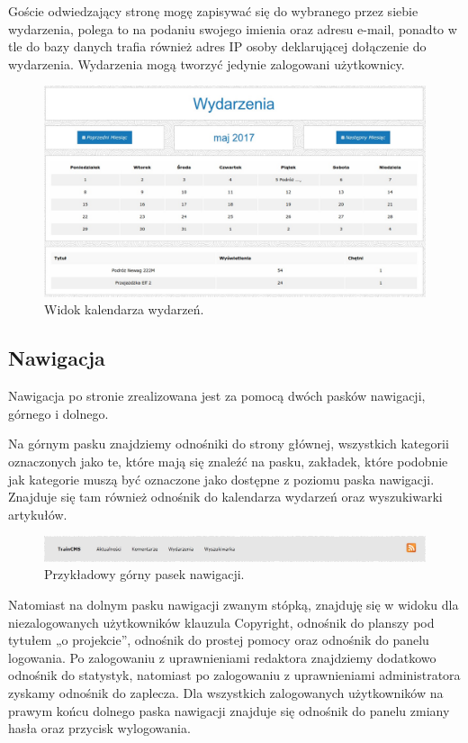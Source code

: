 \documentclass[openright]{xmgr}
\begin{document}
Goście odwiedzający stronę mogę zapisywać się do wybranego przez siebie wydarzenia, polega to na podaniu swojego imienia oraz adresu e-mail, ponadto w tle do bazy danych trafia również adres IP osoby deklarującej dołączenie do wydarzenia. Wydarzenia mogą tworzyć jedynie zalogowani użytkownicy.

\begin{figure}[!tbh]
\centering
\includegraphics[width=\linewidth]{fig/events}
\caption{Widok kalendarza wydarzeń.}
\end{figure}

\subsection{Nawigacja}
Nawigacja po stronie zrealizowana jest za pomocą dwóch pasków nawigacji, górnego i dolnego.

Na górnym pasku znajdziemy odnośniki do strony głównej, wszystkich kategorii oznaczonych jako te, które mają się znaleźć na pasku, zakładek, które podobnie jak kategorie muszą być oznaczone jako dostępne z poziomu paska nawigacji. Znajduje się tam również odnośnik do kalendarza wydarzeń oraz wyszukiwarki artykułów.

\begin{figure}[!tbh]
\centering
\includegraphics[width=\linewidth]{fig/navbar}
\caption{Przykładowy górny pasek nawigacji.}
\end{figure}

Natomiast na dolnym pasku nawigacji zwanym stópką, znajduję się w widoku dla niezalogowanych użytkowników klauzula Copyright, odnośnik do planszy pod tytułem „o projekcie”, odnośnik do prostej pomocy oraz odnośnik do panelu logowania. Po zalogowaniu z uprawnieniami redaktora znajdziemy dodatkowo odnośnik do statystyk, natomiast po zalogowaniu z uprawnieniami administratora zyskamy odnośnik do zaplecza. Dla wszystkich zalogowanych użytkowników na prawym końcu dolnego paska nawigacji znajduje się odnośnik do panelu zmiany hasła oraz przycisk wylogowania.
\end{document}
